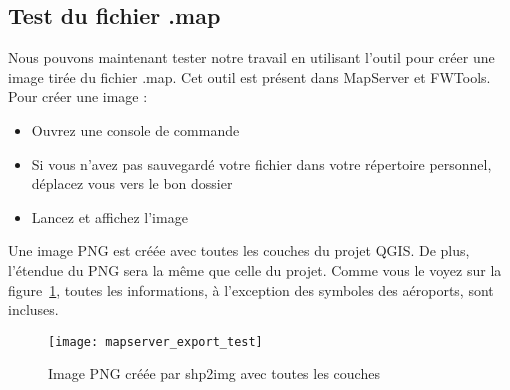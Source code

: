 \subsection{Test du fichier .map}


Nous pouvons maintenant tester notre travail en utilisant l'outil  pour créer une image tirée du fichier .map. Cet outil est présent dans MapServer et FWTools. 
Pour créer une image :


\begin{itemize}
\item Ouvrez une console de commande
\item Si vous n'avez pas sauvegardé votre fichier dans votre répertoire personnel, déplacez vous vers le bon dossier
\item Lancez  et affichez l'image
\end{itemize}
 
Une image PNG est créée avec toutes les couches du projet QGIS. De plus, l'étendue du PNG sera la même que celle du projet. Comme vous le voyez sur la figure~\ref{fig:mapserver_export_test}, toutes les informations, à l'exception des symboles des aéroports, sont incluses.

\begin{figure}[ht]
\centering
  \texttt{[image: mapserver\_export\_test]}
  \caption{Image PNG créée par shp2img avec toutes les couches\nixcaption}
  \label{fig:mapserver_export_test}
\end{figure}

